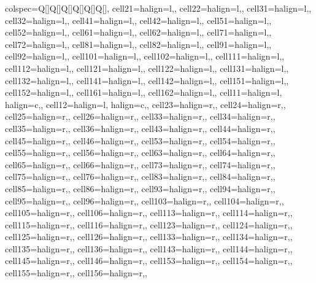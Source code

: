 \begin{table}
\centering
\begin{tblr}[         %
]                     %
{                     %
colspec={Q[]Q[]Q[]Q[]Q[]Q[]},
cell{2}{1}={}{halign=l,},
cell{2}{2}={}{halign=l,},
cell{3}{1}={}{halign=l,},
cell{3}{2}={}{halign=l,},
cell{4}{1}={}{halign=l,},
cell{4}{2}={}{halign=l,},
cell{5}{1}={}{halign=l,},
cell{5}{2}={}{halign=l,},
cell{6}{1}={}{halign=l,},
cell{6}{2}={}{halign=l,},
cell{7}{1}={}{halign=l,},
cell{7}{2}={}{halign=l,},
cell{8}{1}={}{halign=l,},
cell{8}{2}={}{halign=l,},
cell{9}{1}={}{halign=l,},
cell{9}{2}={}{halign=l,},
cell{10}{1}={}{halign=l,},
cell{10}{2}={}{halign=l,},
cell{11}{1}={}{halign=l,},
cell{11}{2}={}{halign=l,},
cell{12}{1}={}{halign=l,},
cell{12}{2}={}{halign=l,},
cell{13}{1}={}{halign=l,},
cell{13}{2}={}{halign=l,},
cell{14}{1}={}{halign=l,},
cell{14}{2}={}{halign=l,},
cell{15}{1}={}{halign=l,},
cell{15}{2}={}{halign=l,},
cell{16}{1}={}{halign=l,},
cell{16}{2}={}{halign=l,},
cell{1}{1}={}{halign=l, halign=c,},
cell{1}{2}={}{halign=l, halign=c,},
cell{2}{3}={}{halign=r,},
cell{2}{4}={}{halign=r,},
cell{2}{5}={}{halign=r,},
cell{2}{6}={}{halign=r,},
cell{3}{3}={}{halign=r,},
cell{3}{4}={}{halign=r,},
cell{3}{5}={}{halign=r,},
cell{3}{6}={}{halign=r,},
cell{4}{3}={}{halign=r,},
cell{4}{4}={}{halign=r,},
cell{4}{5}={}{halign=r,},
cell{4}{6}={}{halign=r,},
cell{5}{3}={}{halign=r,},
cell{5}{4}={}{halign=r,},
cell{5}{5}={}{halign=r,},
cell{5}{6}={}{halign=r,},
cell{6}{3}={}{halign=r,},
cell{6}{4}={}{halign=r,},
cell{6}{5}={}{halign=r,},
cell{6}{6}={}{halign=r,},
cell{7}{3}={}{halign=r,},
cell{7}{4}={}{halign=r,},
cell{7}{5}={}{halign=r,},
cell{7}{6}={}{halign=r,},
cell{8}{3}={}{halign=r,},
cell{8}{4}={}{halign=r,},
cell{8}{5}={}{halign=r,},
cell{8}{6}={}{halign=r,},
cell{9}{3}={}{halign=r,},
cell{9}{4}={}{halign=r,},
cell{9}{5}={}{halign=r,},
cell{9}{6}={}{halign=r,},
cell{10}{3}={}{halign=r,},
cell{10}{4}={}{halign=r,},
cell{10}{5}={}{halign=r,},
cell{10}{6}={}{halign=r,},
cell{11}{3}={}{halign=r,},
cell{11}{4}={}{halign=r,},
cell{11}{5}={}{halign=r,},
cell{11}{6}={}{halign=r,},
cell{12}{3}={}{halign=r,},
cell{12}{4}={}{halign=r,},
cell{12}{5}={}{halign=r,},
cell{12}{6}={}{halign=r,},
cell{13}{3}={}{halign=r,},
cell{13}{4}={}{halign=r,},
cell{13}{5}={}{halign=r,},
cell{13}{6}={}{halign=r,},
cell{14}{3}={}{halign=r,},
cell{14}{4}={}{halign=r,},
cell{14}{5}={}{halign=r,},
cell{14}{6}={}{halign=r,},
cell{15}{3}={}{halign=r,},
cell{15}{4}={}{halign=r,},
cell{15}{5}={}{halign=r,},
cell{15}{6}={}{halign=r,},
}
\end{tblr}
\end{table}
